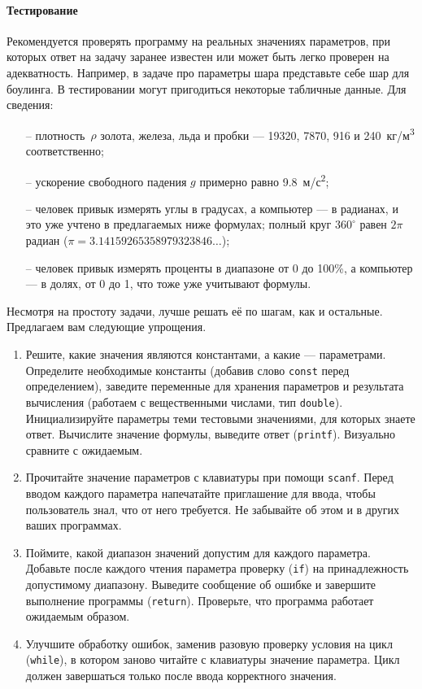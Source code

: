 \paragraph{Тестирование}
Рекомендуется проверять программу на реальных значениях параметров, при
которых ответ на задачу заранее известен или может быть легко проверен на
адекватность. Например, в задаче про параметры шара представьте себе шар для
боулинга.
В тестировании могут пригодиться некоторые табличные данные. Для сведения:
%
\begin{itemize}
%
\item[--] плотность~$\rho$ золота, железа, льда и пробки ---
19320, 7870, 916 и 240~кг/м\textsuperscript{3} соответственно;
%
\item[--] ускорение свободного падения $g$ примерно равно 
9.8~м/с\textsuperscript{2};
%
\item[--] человек привык измерять углы в градусах, а компьютер ---
в радианах, и это уже учтено в предлагаемых ниже формулах;
полный круг $360^{\circ}$ равен $2\pi$ радиан ($\pi = 3.14159265358979323846\dots$);
%
\item[--] человек привык измерять проценты в диапазоне от 0 до 100\%,
а компьютер --- в долях, от 0 до 1, что тоже уже учитывают формулы.
\end{itemize}


\zzsectionPLAN

Несмотря на простоту задачи, лучше решать её по шагам, как и остальные.
Предлагаем вам следующие упрощения.

\begin{enumerate}
\item Решите, какие значения являются константами, а какие --- параметрами.
Определите необходимые константы (добавив слово \texttt{const} перед
определением), заведите переменные для хранения параметров и результата
вычисления (работаем с вещественными числами, тип \texttt{double}).
Инициализируйте параметры теми тестовыми значениями, для которых знаете ответ.
Вычислите значение формулы, выведите ответ (\texttt{printf}).
Визуально сравните с ожидаемым.

\item Прочитайте значение параметров с клавиатуры при помощи \texttt{scanf}.
Перед вводом каждого параметра напечатайте приглашение для ввода, чтобы
пользователь знал, что от него требуется. Не забывайте об этом и в других
ваших программах.

\item Поймите, какой диапазон значений допустим для каждого параметра.
Добавьте после каждого чтения параметра проверку (\texttt{if}) на
принадлежность допустимому диапазону. Выведите сообщение об ошибке и
завершите выполнение программы (\texttt{return}). Проверьте, что программа
работает ожидаемым образом.

\item Улучшите обработку ошибок, заменив разовую проверку условия на цикл
(\texttt{while}), в котором заново читайте с клавиатуры значение параметра.
Цикл должен завершаться только после ввода корректного значения.
\end{enumerate}


